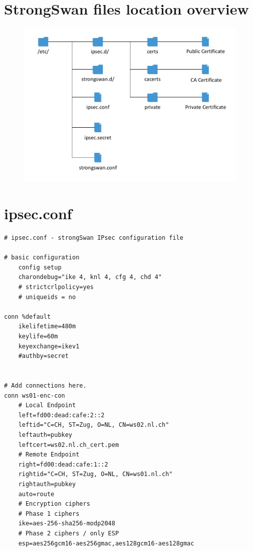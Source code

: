 \documentclass[a4paper]{report}
\begin{document}
\section{StrongSwan files location overview}
\begin{figure}[h!]
	\label{fig:StrongSwanFiles}
	\includegraphics[keepaspectratio,width=\textwidth]{StrongSwan_Files.pdf}
\end{figure}

\newpage

\section{ipsec.conf}
\label{app-sec:ipsec.conf-P2P}
\begin{lstlisting}
# ipsec.conf - strongSwan IPsec configuration file

# basic configuration
    config setup
    charondebug="ike 4, knl 4, cfg 4, chd 4"
    # strictcrlpolicy=yes
    # uniqueids = no

conn %default
    ikelifetime=480m
    keylife=60m
    keyexchange=ikev1
    #authby=secret


# Add connections here.
conn ws01-enc-con
    # Local Endpoint
    left=fd00:dead:cafe:2::2
    leftid="C=CH, ST=Zug, O=NL, CN=ws02.nl.ch"
    leftauth=pubkey
    leftcert=ws02.nl.ch_cert.pem
    # Remote Endpoint
    right=fd00:dead:cafe:1::2
    rightid="C=CH, ST=Zug, O=NL, CN=ws01.nl.ch"
    rightauth=pubkey
    auto=route
    # Encryption ciphers
    # Phase 1 ciphers
    ike=aes-256-sha256-modp2048
    # Phase 2 ciphers / only ESP
    esp=aes256gcm16-aes256gmac,aes128gcm16-aes128gmac
\end{lstlisting}
\end{document}
